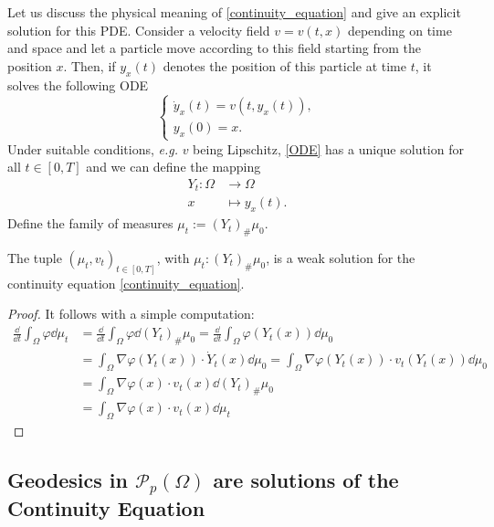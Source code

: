 Let us discuss the physical meaning of \eqref{continuity_equation} and give an explicit solution for this PDE. Consider a velocity field $v = v(t,x)$ depending on time and space and let a particle move according to this field starting from the position $x$. Then, if $y_x(t)$ denotes the position of this particle at time $t$, it solves the following ODE
\begin{equation}
\label{ODE}
\tag{ODE}
\left\{
\begin{array}{l}
\dot{y}_x(t) = v(t, y_x(t)),\\
y_x(0) = x.
\end{array}
\right. 
\end{equation}
Under suitable conditions, {\em e.g.} $v$ being Lipschitz, \eqref{ODE} has a unique solution for all $t \in [0,T]$ and we can define the mapping 
\begin{equation}
\label{ODE.flow}
\begin{array}{rl}
Y_t: \Omega &\to \Omega\\
x & \mapsto y_x(t).
\end{array}
\end{equation}
Define the family of measures $\mu_t:= (Y_t)_{\#}\mu_0$. 
\begin{proposition}
	\label{proposition.CE_explicit_sol}
	The tuple $(\mu_t, v_t)_{t \in [0,T]}$, with $\mu_t: (Y_t)_{\#}\mu_0$, is a weak solution for the continuity equation \eqref{continuity_equation}. 
\end{proposition}
\begin{proof}
	It follows with a simple computation:
	\begin{align*}
	\frac{\dd}{\dd t}\int_{\Omega}\varphi \dd \mu_t 
	&= \frac{\dd}{\dd t}\int_{\Omega}\varphi \dd (Y_t)_{\#}\mu_0 
	= \frac{\dd}{\dd t}\int_{\Omega}\varphi\left(Y_t(x)\right) \dd\mu_0\\
	&= \int_{\Omega}\nabla\varphi\left(Y_t(x)\right)\cdot \dot{Y}_t(x) \dd\mu_0 
	= 
	\int_{\Omega}\nabla\varphi\left(Y_t(x)\right)\cdot v_t(Y_t(x)) \dd\mu_0\\
	&= \int_{\Omega}\nabla\varphi\left(x\right)\cdot v_t(x) \dd(Y_t)_{\#}\mu_0\\
	&= \int_{\Omega}\nabla\varphi\left(x\right)\cdot v_t(x) \dd\mu_t
	\end{align*}
\end{proof}

\subsection{Geodesics in $\mathcal{P}_p(\Omega)$ are solutions of the Continuity Equation}

